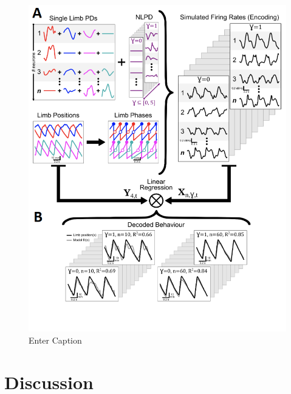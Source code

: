 \begin{figure}[h]
    \centering
    \includegraphics[width=1\linewidth]{Chapters//Figures//chapter3/encoderdecoder.png}
    \caption{Enter Caption}
    \label{fig:encdecccc}
\end{figure}



\section{Discussion}

